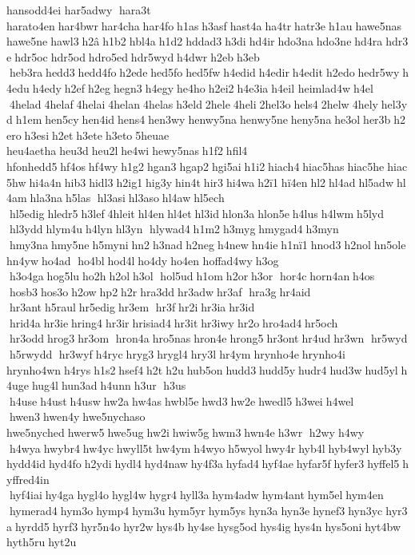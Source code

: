 hansodd4ei 	har5adwy  hara3t 	harato4en har4bwr har4cha har4fo h1as h3asf hast4a ha4tr hatr3e h1au hawe5nas hawe5ne hawl3 h2â h1b2 hbl4a h1d2 hddad3 h3di hd4ir hdo3na hdo3ne hd4ra hdr3e hdr5oc hdr5od hdro5ed hdr5wyd h4dwr h2eb h3eb  heb3ra hedd3 hedd4fo h2ede hed5fo hed5fw h4edid h4edir h4edit h2edo hedr5wy h4edu h4edy h2ef h2eg hegn3 h4egy he4ho h2ei2 h4e3ia h4eil 	heimlad4w h4el  4helad 4helaf 4helai 4helan 4helas h3eld 2hele 4heli 2hel3o hels4 2helw 4hely hel3yd h1em hen5cy hen4id hens4 hen3wy henwy5na henwy5ne heny5na he3ol her3b h2ero h3esi h2et h3ete h3eto 5heuae 	heu4aetha heu3d heu2l he4wi hewy5nas h1f2 hfil4 	hfonhedd5 hf4os hf4wy h1g2 hgan3 hgap2 hgi5ai h1i2 hiach4 hiac5has hiac5he hiac5hw hi4a4n hib3 hidl3 h2ig1 hig3y hin4t hir3 hi4wa h2ï1 hï4en hl2 hl4ad hl5adw hl4am hla3na h5las  hl3asi hl3aso hl4aw hl5ech  hl5edig hledr5 h3lef 4hleit hl4en hl4et hl3id hlon3a hlon5e h4lus h4lwm h5lyd  hl3ydd hlym4u h4lyn hl3yn  hlywad4 h1m2 h3myg hmygad4 h3myn  hmy3na hmy5ne h5myni hn2 h3nad h2neg h4new hn4ie h1nï1 hnod3 h2nol hn5ole hn4yw ho4ad  ho4bl hod4l ho4dy ho4en 	hoffad4wy h3og  h3o4ga hog5lu ho2h h2ol h3ol  hol5ud h1om h2or h3or  hor4c horn4an h4os  hosb3 hos3o h2ow hp2 h2r hra3dd hr3adw hr3af  hra3g hr4aid  hr3ant h5raul hr5edig hr3em  hr3f hr2i hr3ia hr3id  hrid4a hr3ie hring4 hr3ir hrisiad4 hr3it hr3iwy hr2o hro4ad4 hr5och  hr3odd hrog3 hr3om  hron4a hro5nas hron4e hrong5 hr3ont hr4ud hr3wn  hr5wyd  h5rwydd  hr3wyf h4ryc hryg3 hrygl4 hry3l hr4ym hrynho4e hrynho4i 	hrynho4wn h4rys h1s2 hsef4 h2t h2u hub5on hudd3 hudd5y hudr4 hud3w hud5yl h4uge hug4l hun3ad h4unn h3ur  h3us  h4use h4ust h4usw hw2a hw4as hwbl5e hwd3 hw2e hwedl5 h3wei h4wel  hwen3 hwen4y hwe5nychaso 
hwe5nyched hwerw5 hwe5ug hw2i hwiw5g hwm3 hwn4e h3wr  h2wy h4wy  h4wya hwybr4 hw4yc hwyll5t hw4ym h4wyo h5wyol hwy4r hyb4l hyb4wyl hyb3y hydd4id hyd4fo h2ydi hydl4 hyd4naw hy4f3a hyfad4 hyf4ae hyfar5f hyfer3 hyffel5 hyffred4in  hyf4iai hy4ga hygl4o hygl4w hygr4 hyll3a hym4adw hym4ant hym5el hym4en  hymerad4 hym3o hymp4 hym3u hym5yr hym5ys hyn3a hyn3e hynef3 hyn3yc hyr3a hyrdd5 hyrf3 hyr5n4o hyr2w hys4b hy4se hysg5od hys4ig hys4n hys5oni hyt4bw hyth5ru hyt2u 
